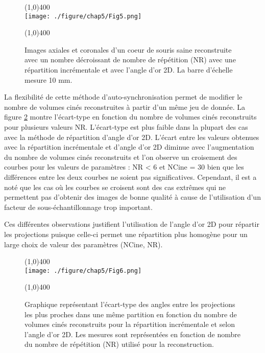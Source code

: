 \begin{figure}[H]
\centering
\line(1,0){400} \\
\texttt{[image: ./figure/chap5/Fig5.png]}
\caption[Image de l'nfluence de la trajectoire en fonction du sous-échantillonnage]{\label{fig:ImGoldVSIncNr} Images axiales et coronales d'un coeur de souris saine reconstruite avec un nombre décroissant de nombre de répétition (NR) avec une répartition incrémentale et avec l'angle d'or 2D. La barre d'échelle mesure 10 mm.}
\line(1,0){400} \\ 
\end{figure}

La flexibilité de cette méthode d'auto-synchronisation permet de modifier le nombre de volumes cinés reconstruites à partir d'un même jeu de donnée. La figure \ref{fig:GoldVSIncNCine} montre l'écart-type en fonction du nombre de volumes cinés reconstruits pour plusieurs valeurs NR. L'écart-type est plus faible dans la plupart des cas avec la méthode de répartition d'angle d'or 2D. L'écart entre les valeurs obtenues avec la répartition incrémentale et d'angle d'or 2D diminue avec l'augmentation du nombre de volumes cinés reconstruits et l'on observe un croisement des courbes pour les valeurs de paramètres : NR < 6 et NCine = 30 bien que les différences entre les deux courbes ne soient pas significatives. Cependant, il est a noté que les cas où les courbes se croisent sont des cas extrêmes qui ne permettent pas d'obtenir des images de bonne qualité à cause de l'utilisation d'un facteur de sous-échantillonnage trop important.

Ces différentes observations justifient l'utilisation de l'angle d'or 2D pour répartir les projections puisque celle-ci permet une répartition plus homogène pour un large choix de valeur des paramètres (NCine, NR). 

\begin{figure}[H]
\centering
\line(1,0){400} \\
\texttt{[image: ./figure/chap5/Fig6.png]}
\caption[Influence de la trajectoire en fonction du nombre d'images cinés reconstruite]{\label{fig:GoldVSIncNCine} Graphique représentant  l'écart-type des angles entre les projections les plus proches dans une même partition en fonction du nombre de volumes cinés reconstruits pour la répartition incrémentale et selon l'angle d'or 2D. Les mesures sont représentées en fonction de nombre du nombre de répétition (NR) utilisé pour la reconstruction.}
\line(1,0){400} \\ 
\end{figure}

